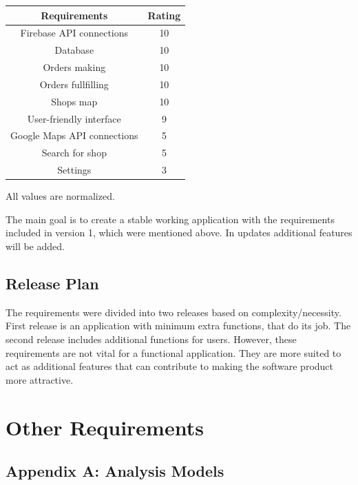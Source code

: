 \documentclass{scrreprt}
\begin{document}
\begin{tabular}{| c | c |} \hline
\textbf {Requirements} & \textbf{Rating} \\ \hline
Firebase API connections & 10\\ \hline
Database & 10\\ \hline
Orders making & 10\\ \hline
Orders fullfilling & 10\\ \hline
Shops map & 10\\ \hline
User-friendly interface & 9\\ \hline
Google Maps API connections & 5\\ \hline
Search for shop & 5\\ \hline
Settings & 3\\ \hline
\end{tabular}

All values are normalized. 

The main goal is to create a stable working application with the requirements included in version 1, which were mentioned above. In updates additional features will be added. 

\section{Release Plan}
The requirements were divided into two releases based on complexity/necessity. First release is an application with minimum extra functions, that do its job. The second release includes additional functions for users. However, these requirements are not vital for a functional application. They are more suited to act as additional features that can contribute to making the software product more attractive.

\chapter{Other Requirements}

\section{Appendix A: Analysis Models}
\begin{figure}[h]
\end{figure}
\end{document}
